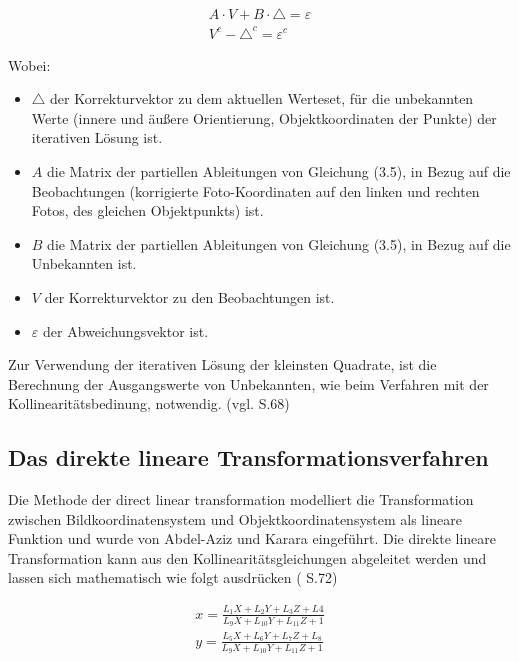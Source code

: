 \begin{equation}
\begin{aligned}
A\cdot V + B\cdot \triangle = \varepsilon \\
V^c - \triangle^c = \varepsilon^c
\end{aligned}
\end{equation}


Wobei:
\begin{itemize}
\item $\triangle$ der Korrekturvektor zu dem aktuellen Werteset, für die unbekannten Werte (innere und äußere Orientierung, Objektkoordinaten der Punkte) der iterativen Lösung ist.

\item $A$ die Matrix der partiellen Ableitungen von Gleichung (3.5), in Bezug auf die Beobachtungen (korrigierte Foto-Koordinaten auf den linken und rechten Fotos, des gleichen Objektpunkts) ist.

\item $B$ die Matrix der partiellen Ableitungen von Gleichung (3.5), in Bezug auf die Unbekannten  ist.

\item $V$ der Korrekturvektor zu den Beobachtungen ist.

\item $\varepsilon$ der Abweichungsvektor ist.
\end{itemize}

Zur Verwendung der iterativen Lösung der kleinsten Quadrate, ist die Berechnung der Ausgangswerte von Unbekannten, wie beim Verfahren mit der Kollinearitätsbedinung, notwendig. (vgl. \cite{comparative_conditions_study} S.68)


\subsection{Das direkte lineare Transformationsverfahren}

Die Methode der \glqq direct linear transformation\grqq{}  modelliert die Transformation zwischen Bildkoordinatensystem und Objektkoordinatensystem als lineare Funktion und wurde von Abdel-Aziz und Karara \cite{dlt_intro} eingeführt. Die direkte lineare Transformation kann aus den Kollinearitätsgleichungen abgeleitet werden und lassen sich mathematisch wie folgt ausdrücken (\cite{dlt} S.72)

\begin{equation}
\begin{aligned}
x=\frac{L_1X+L_2Y+L_3Z+L4}{L_9X+L_{10}Y+L_{11}Z+1} \\
y=\frac{L_5X+L_6Y+L_7Z+L_8}{L_9X+L_{10}Y+L_{11}Z+1}
\end{aligned}
\end{equation}

